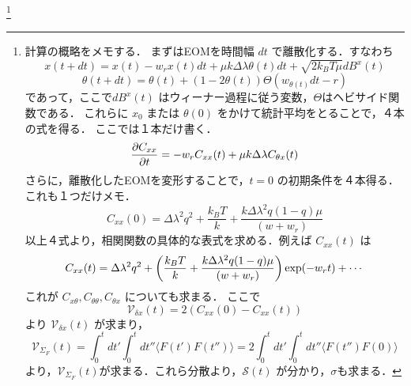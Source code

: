 \documentclass{jsarticle}
\numberwithin{equation}{section}
\theoremstyle{definition}
\newcommand{\ave}[1]{\langle #1 \rangle}
\begin{document}
\footnote{
計算の概略をメモする．
まずはEOMを時間幅 $dt$ で離散化する．すなわち
\begin{equation}
  x(t+dt) = x(t) - w_r x(t) dt + \mu k \Delta \lambda \theta (t)dt + \sqrt{ 2 k_B T \mu  } d B^x(t)
\end{equation}
\begin{equation}
  \theta(t+dt) = \theta(t) + (1 -2\theta(t)) \Theta(w_{\theta(t)}dt-r)
\end{equation}
であって，ここで$dB^x(t)$ はウィーナー過程に従う変数，$\Theta$はヘビサイド関数である．
これらに $x_0$ または $\theta(0)$ をかけて統計平均をとることで，４本の式を得る．
ここでは１本だけ書く．
\begin{equation}
  \pdv{C_{xx}}{t} (t) = - w_r C_{xx}(t) + \mu k \Delta \lambda C_{\theta x} (t)
\end{equation}
さらに，離散化したEOMを変形することで，$t=0$ の初期条件を４本得る．これも１つだけメモ．
\begin{equation}
  C_{xx} (0) = \Delta \lambda^2 q^2 + \frac{k_B T}{k} + \frac{k \Delta \lambda^2 q(1-q)\mu }{(w+w_r)}
\end{equation}
以上４式より，相関関数の具体的な表式を求める．例えば $C_{xx}(t)$ は 
\begin{equation}
  C_{xx} (t) = \Delta \lambda^2 q^2 + \qty( \frac{k_B T}{k} + \frac{k \Delta \lambda^2 q(1-q)\mu }{(w + w_r)} ) \exp(- w_r t) + \cdots
\end{equation}
これが $C_{x \theta}, C_{\theta \theta}, C_{\theta x}$ についても求まる．
ここで 
\begin{equation}
  \mathcal{V}_{\delta x} (t) = 2 (C_{xx}(0) - C_{xx}(t))
\end{equation}
より $\mathcal{V}_{\delta x} (t) $ が求まり，
\begin{equation}
  \mathcal{V}_{\Sigma_F} (t) = \int_0^t dt' \int_0^t dt'' \ave{F(t')F(t'')} = 2 \int_0^t dt' \int_0^t dt'' \ave{F(t'')F(0)}
\end{equation}
より，$\mathcal{V}_{\Sigma_F} (t)$が求まる．これら分散より，$\mathcal{S}(t)$ が分かり，$\sigma$も求まる．

}
\end{document}
